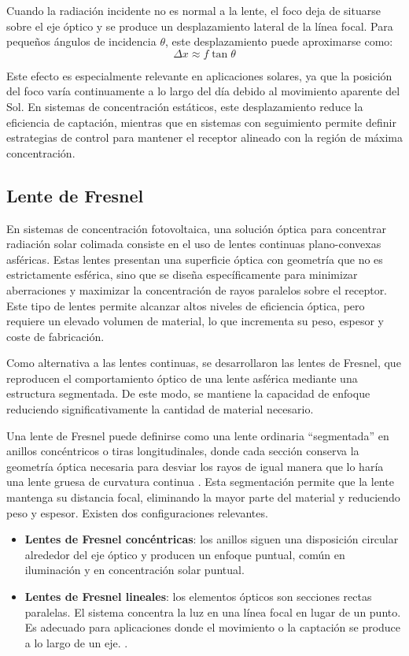 Cuando la radiación incidente no es normal a la lente, el foco deja de situarse sobre el eje óptico y se produce un desplazamiento lateral de la línea focal. Para pequeños ángulos de incidencia $\theta$, este desplazamiento puede aproximarse como:
\begin{equation}
	\Delta x \approx f \tan{\theta}
\end{equation}

Este efecto es especialmente relevante en aplicaciones solares, ya que la posición del foco varía continuamente a lo largo del día debido al movimiento aparente del Sol. En sistemas de concentración estáticos, este desplazamiento reduce la eficiencia de captación, mientras que en sistemas con seguimiento permite definir estrategias de control para mantener el receptor alineado con la región de máxima concentración.


\subsection{Lente de Fresnel}\label{sec:fresnel}
En sistemas de concentración fotovoltaica, una solución óptica para concentrar radiación solar colimada consiste en el uso de lentes continuas plano-convexas asféricas. Estas lentes presentan una superficie óptica con geometría que no es estrictamente esférica, sino que se diseña específicamente para minimizar aberraciones y maximizar la concentración de rayos paralelos sobre el receptor. Este tipo de lentes permite alcanzar altos niveles de eficiencia óptica, pero requiere un elevado volumen de material, lo que incrementa su peso, espesor y coste de fabricación.

Como alternativa a las lentes continuas, se desarrollaron las lentes de Fresnel, que reproducen el comportamiento óptico de una lente asférica mediante una estructura segmentada. De este modo, se mantiene la capacidad de enfoque reduciendo significativamente la cantidad de material necesario.

Una lente de Fresnel puede definirse como una lente ordinaria “segmentada” en anillos concéntricos o tiras longitudinales, donde cada sección conserva la geometría óptica necesaria para desviar los rayos de igual manera que lo haría una lente gruesa de curvatura continua \cite{smith2007}. Esta segmentación permite que la lente mantenga su distancia focal, eliminando la mayor parte del material y reduciendo peso y espesor. Existen dos configuraciones relevantes. 
\begin{itemize}
	\item \textbf{Lentes de Fresnel concéntricas}: los anillos siguen una disposición circular alrededor del eje óptico y producen un enfoque puntual, común en iluminación y en concentración solar puntual.
	\item\textbf{Lentes de Fresnel lineales}: los elementos ópticos son secciones rectas paralelas. El sistema concentra la luz en una línea focal en lugar de un punto. Es adecuado para aplicaciones donde el movimiento o la captación se produce a lo largo de un eje. \cite{pedrotti2017}.
\end{itemize}

